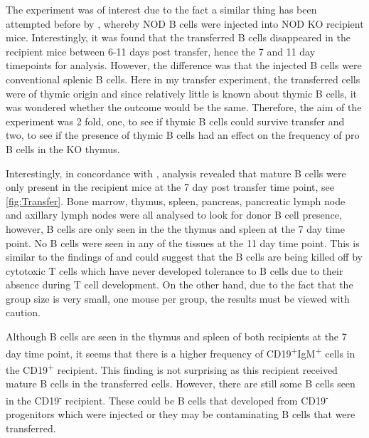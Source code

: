The experiment was of interest due to the fact a similar thing has been attempted before by \citet{Serreze1998}, whereby NOD B cells were injected into NOD KO recipient mice.
Interestingly, it was found that the transferred B cells disappeared in the recipient mice between 6-11 days post transfer, hence the 7 and 11 day timepoints for analysis.
However, the difference was that the injected B cells were conventional splenic B cells.
Here in my transfer experiment, the transferred cells were of thymic origin and since relatively little is known about thymic B cells, it was wondered whether the outcome would be the same. 
Therefore, the aim of the experiment was 2 fold, one, to see if thymic B cells could survive transfer and two, to see if the presence of thymic B cells had an effect on the frequency of pro B cells in the KO thymus.

Interestingly, in concordance with \citet{Serreze1998}, analysis revealed that mature B cells were only present in the recipient mice at the 7 day post transfer time point, see \cref{fig:Transfer}.
Bone marrow, thymus, spleen, pancreas, pancreatic lymph node and axillary lymph nodes were all analysed to look for donor B cell presence, however, B cells are only seen in the the thymus and spleen at the 7 day time point.
No B cells were seen in any of the tissues at the 11 day time point.
This is similar to the findings of \citet{Serreze1998} and could suggest that the B cells are being killed off by cytotoxic T cells which have never developed tolerance to B cells due to their absence during T cell development.
On the other hand, due to the fact that the group size is very small, one mouse per group, the results must be viewed with caution.

Although B cells are seen in the thymus and spleen of both recipients at the 7 day time point, it seems that there is a higher frequency of CD19\textsuperscript{+}IgM\textsuperscript{+} cells in the CD19\textsuperscript{+} recipient.
This finding is not surprising as this recipient received mature B cells in the transferred cells.
However, there are still some B cells seen in the CD19\textsuperscript{-} recipient.
These could be B cells that developed from CD19\textsuperscript{-} progenitors which were injected or they may be contaminating B cells that were transferred.


